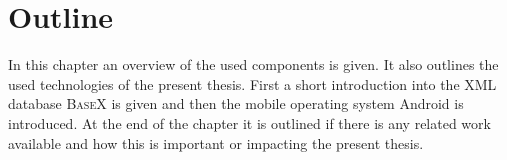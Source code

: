 \chapter{Outline}
\label{cha:overview}
In this chapter an overview of the used components is given.
It also outlines the used technologies of the present thesis.
First a short introduction into the XML database \textsc{BaseX} is given and then the mobile operating system Android is introduced.
At the end of the chapter it is outlined if there is any related work available and how this is important or impacting the present thesis.

%

